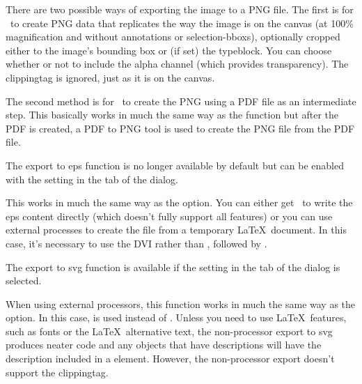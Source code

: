 \begin{deflist}

\begin{itemdesc}
There are two possible ways of exporting the image to a PNG file.
The first is for \FlowframTk\ to create PNG data that replicates
the way the image is  on the \gls{canvas}
(at 100\% magnification and without annotations or
\glspl{selection-bbox}), optionally cropped either to the image's
bounding box or (if set) the \gls{typeblock}. You can choose whether
or not to include the alpha channel (which provides transparency).
The \gls{clippingtag} is ignored, just as it is on the \gls{canvas}.

The second method is for \FlowframTk\ to create the PNG using a PDF
file as an intermediate step. This basically works in much the same
way as the  function but after the PDF is
created, a PDF to PNG tool is used to create the PNG file from the
PDF file.
\end{itemdesc}


\begin{itemdesc}
The export to \gls{eps} function is no longer available by default but can
be enabled with the  setting in 
the  tab of the  dialog.

This works in much the same way as the  option.
You can either get \FlowframTk\ to write the \gls{eps} content directly
(which doesn't fully support all features) or you can use external
processes to create the file from a temporary \LaTeX\ document.
In this case, it's necessary to use the DVI  rather than
, followed by .
\end{itemdesc}


\begin{itemdesc}
The export to \gls{svg} function is available if the
 setting in the
 tab of the  dialog is
selected.

When using external processors, this function works in much the same
way as the  option.  In this case, 
is used instead of . Unless you need to use \LaTeX\
features, such as fonts or the \LaTeX\ alternative text, the
non-processor export to \gls{svg} produces neater code and any
\glspl{object} that have descriptions will have the description included
in a \xmlelem{title} element. However, the non-processor export
doesn't support the \gls{clippingtag}.
\end{itemdesc}

\end{deflist}

